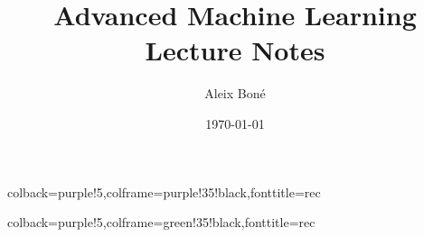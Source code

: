 %
{colback=purple!5,colframe=purple!35!black,fonttitle=\bfseries}{rec}

%
{colback=purple!5,colframe=green!35!black,fonttitle=\bfseries}{rec}


\renewcommand\and{\\[\baselineskip]}

\title{\Huge Advanced Machine Learning\\ \Large Lecture Notes}
\author{Aleix Boné}
\date{\today}

\makeindex


\newcommand{\iemph}[1]{\index{#1}\emph{#1}}






\tableofcontents \pagebreak

\listoffigures \listoftables \clearpage



\setlength{\parskip}{1em plus 0.5em minus 0.2em}







\nocite{*}

\printindex\pagebreak
\printbibliography


